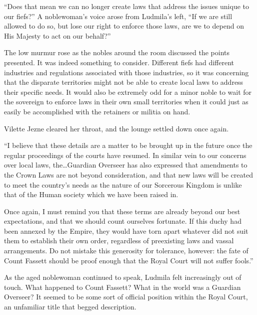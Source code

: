  

“Does that mean we can no longer create laws that address the issues unique to our fiefs?” A noblewoman’s voice arose from Ludmila’s left, “If we are still allowed to do so, but lose our right to enforce those laws, are we to depend on His Majesty to act on our behalf?”

 

The low murmur rose as the nobles around the room discussed the points presented. It was indeed something to consider. Different fiefs had different industries and regulations associated with those industries, so it was concerning that the disparate territories might not be able to create local laws to address their specific needs. It would also be extremely odd for a minor noble to wait for the sovereign to enforce laws in their own small territories when it could just as easily be accomplished with the retainers or militia on hand.

 

Vilette Jezne cleared her throat, and the lounge settled down once again.

 

“I believe that these details are a matter to be brought up in the future once the regular proceedings of the courts have resumed. In similar vein to our concerns over local laws, the…Guardian Overseer has also expressed that amendments to the Crown Laws are not beyond consideration, and that new laws will be created to meet the country’s needs as the nature of our Sorcerous Kingdom is unlike that of the Human society which we have been raised in.

 

Once again, I must remind you that these terms are already beyond our best expectations, and that we should count ourselves fortunate. If this duchy had been annexed by the Empire, they would have torn apart whatever did not suit them to establish their own order, regardless of preexisting laws and vassal arrangements. Do not mistake this generosity for tolerance, however: the fate of Count Fassett should be proof enough that the Royal Court will not suffer fools.”

 

As the aged noblewoman continued to speak, Ludmila felt increasingly out of touch. What happened to Count Fassett? What in the world was a Guardian Overseer? It seemed to be some sort of official position within the Royal Court, an unfamiliar title that begged description.

 

